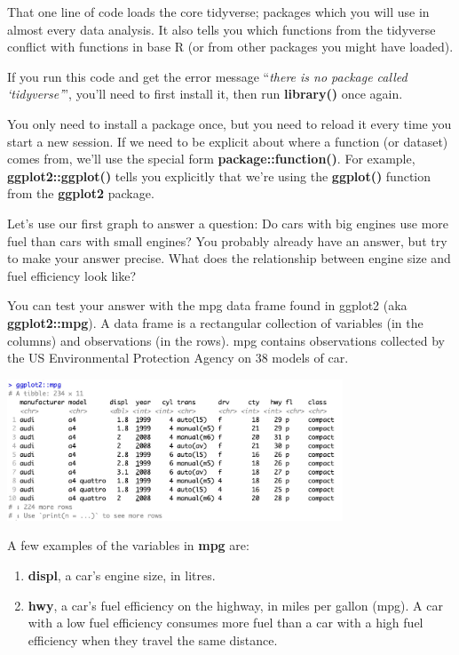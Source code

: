 \documentclass[
  letterpaper,
  DIV=11,
  numbers=noendperiod]{scrreprt}
\begin{document}
That one line of code loads the core tidyverse; packages which you will
use in almost every data analysis. It also tells you which functions
from the tidyverse conflict with functions in base R (or from other
packages you might have loaded).

If you run this code and get the error message ``\emph{there is no
package called `tidyverse'}'', you'll need to first install it, then run
\textbf{library()} once again.

You only need to install a package once, but you need to reload it every
time you start a new session. If we need to be explicit about where a
function (or dataset) comes from, we'll use the special form
\textbf{package::function()}. For example, \textbf{ggplot2::ggplot()}
tells you explicitly that we're using the \textbf{ggplot()} function
from the \textbf{ggplot2} package.

Let's use our first graph to answer a question: Do cars with big engines
use more fuel than cars with small engines? You probably already have an
answer, but try to make your answer precise. What does the relationship
between engine size and fuel efficiency look like?

You can test your answer with the mpg data frame found in ggplot2 (aka
\textbf{ggplot2::mpg}). A data frame is a rectangular collection of
variables (in the columns) and observations (in the rows). mpg contains
observations collected by the US Environmental Protection Agency on 38
models of car.

\includegraphics[width=0.75\textwidth,height=\textheight]{./images/Daily-2-Pic-2.jpg}

A few examples of the variables in \textbf{mpg} are:

\begin{enumerate}
\def\labelenumi{\arabic{enumi}.}
\item
  \textbf{displ}, a car's engine size, in litres.
\item
  \textbf{hwy}, a car's fuel efficiency on the highway, in miles per
  gallon (mpg). A car with a low fuel efficiency consumes more fuel than
  a car with a high fuel efficiency when they travel the same distance.
\end{enumerate}
\end{document}
